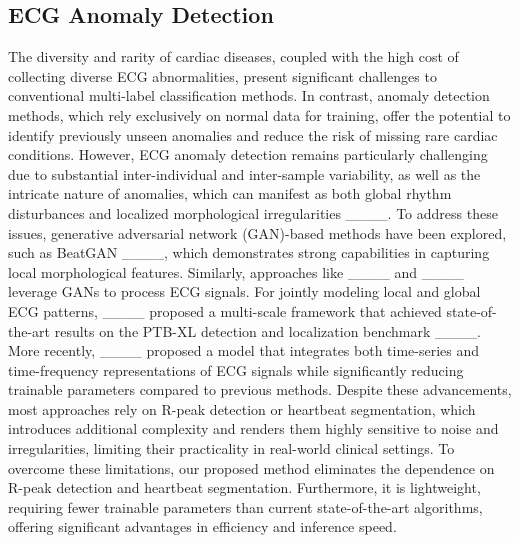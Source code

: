 \subsection{ECG Anomaly Detection}
The diversity and rarity of cardiac diseases, coupled with the high cost of collecting diverse ECG abnormalities, present significant challenges to conventional multi-label classification methods. In contrast, anomaly detection methods, which rely exclusively on normal data for training, offer the potential to identify previously unseen anomalies and reduce the risk of missing rare cardiac conditions. However, ECG anomaly detection remains particularly challenging due to substantial inter-individual and inter-sample variability, as well as the intricate nature of anomalies, which can manifest as both global rhythm disturbances and localized morphological irregularities ____. To address these issues, generative adversarial network (GAN)-based methods have been explored, such as BeatGAN ____, which demonstrates strong capabilities in capturing local morphological features. Similarly, approaches like ____ and ____ leverage GANs to process ECG signals. For jointly modeling local and global ECG patterns,  ____ proposed a multi-scale framework that achieved state-of-the-art results on the PTB-XL detection and localization benchmark ____. More recently, ____ proposed a model that integrates both time-series and time-frequency representations of ECG signals while significantly reducing trainable parameters compared to previous methods. Despite these advancements, most approaches rely on R-peak detection or heartbeat segmentation, which introduces additional complexity and renders them highly sensitive to noise and irregularities, limiting their practicality in real-world clinical settings. To overcome these limitations, our proposed method eliminates the dependence on R-peak detection and heartbeat segmentation. Furthermore, it is lightweight, requiring fewer trainable parameters than current state-of-the-art algorithms, offering significant advantages in efficiency and inference speed.

